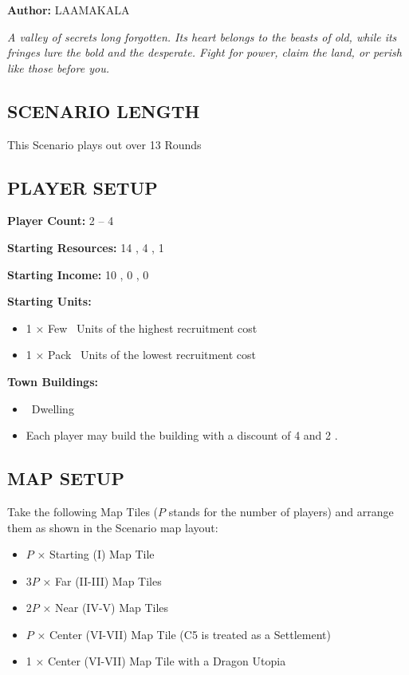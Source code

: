 
\begin{multicols*}{2}

\textbf{Author:} LAAMAKALA

\textit{A valley of secrets long forgotten. Its heart belongs to the beasts of old, while its fringes lure the bold and the desperate. Fight for power, claim the land, or perish like those before you.}

\subsection*{\MakeUppercase{Scenario Length}}
This Scenario plays out over 13 Rounds

\subsection*{\MakeUppercase{Player Setup}}
\textbf{Player Count:} 2 -- 4

\textbf{Starting Resources:} 14 , 4 , 1 

\textbf{Starting Income:} 10 , 0 , 0 

\textbf{Starting Units:}

\begin{itemize}
  \item 1 × Few \bronze\ Units of the highest recruitment cost
  \item 1 × Pack \bronze\ Units of the lowest recruitment cost
\end{itemize}

\textbf{Town Buildings:}
\begin{itemize}
  \item \bronze\ Dwelling
  \item Each player may build the  building with a discount of 4  and 2 .
\end{itemize}

\subsection*{\MakeUppercase{Map Setup}}
Take the following Map Tiles ($P$ stands for the number of players) and arrange them as shown in the Scenario map layout:

\begin{itemize}
  \item $P$ × Starting (I) Map Tile
  \item 3$P$ × Far (II-III) Map Tiles
  \item 2$P$ × Near (IV-V) Map Tiles
  \item $P$ × Center (VI-VII) Map Tile (C5 is treated as a Settlement)
  \item 1 × Center (VI-VII) Map Tile with a Dragon Utopia
\end{itemize}


\end{multicols*}
